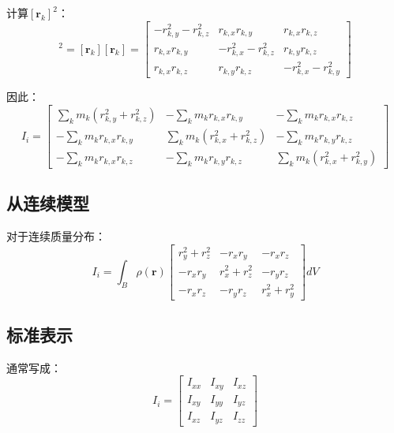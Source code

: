 \documentclass[12pt,a4paper]{article}
\begin{document}
计算$[\bm{r}_k]^2$：
\begin{equation}
[\bm{r}_k]^2 = [\bm{r}_k][\bm{r}_k] = \begin{bmatrix}
-r_{k,y}^2 - r_{k,z}^2 & r_{k,x} r_{k,y} & r_{k,x} r_{k,z} \\
r_{k,x} r_{k,y} & -r_{k,x}^2 - r_{k,z}^2 & r_{k,y} r_{k,z} \\
r_{k,x} r_{k,z} & r_{k,y} r_{k,z} & -r_{k,x}^2 - r_{k,y}^2
\end{bmatrix}
\end{equation}

因此：
\begin{equation}
I_i = \begin{bmatrix}
\sum_k m_k (r_{k,y}^2 + r_{k,z}^2) & -\sum_k m_k r_{k,x} r_{k,y} & -\sum_k m_k r_{k,x} r_{k,z} \\
-\sum_k m_k r_{k,x} r_{k,y} & \sum_k m_k (r_{k,x}^2 + r_{k,z}^2) & -\sum_k m_k r_{k,y} r_{k,z} \\
-\sum_k m_k r_{k,x} r_{k,z} & -\sum_k m_k r_{k,y} r_{k,z} & \sum_k m_k (r_{k,x}^2 + r_{k,y}^2)
\end{bmatrix}
\end{equation}

\subsection{从连续模型}

对于连续质量分布：
\begin{equation}
I_i = \int_B \rho(\bm{r}) \begin{bmatrix}
r_y^2 + r_z^2 & -r_x r_y & -r_x r_z \\
-r_x r_y & r_x^2 + r_z^2 & -r_y r_z \\
-r_x r_z & -r_y r_z & r_x^2 + r_y^2
\end{bmatrix} dV
\end{equation}

\subsection{标准表示}

通常写成：
\begin{equation}
I_i = \begin{bmatrix}
I_{xx} & I_{xy} & I_{xz} \\
I_{xy} & I_{yy} & I_{yz} \\
I_{xz} & I_{yz} & I_{zz}
\end{bmatrix}
\end{equation}
\end{document}
